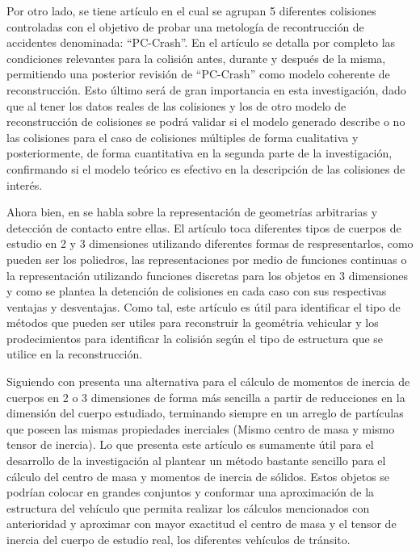 \begin{singlespace}
\hspace{1 cm} Por otro lado, se tiene \citet{Risac} artículo en el cual se agrupan 5 diferentes colisiones controladas con el objetivo de probar una metología de recontrucción de accidentes denominada: ``PC-Crash''. En el artículo se detalla por completo las condiciones relevantes para la colisión antes, durante y después de la misma, permitiendo una posterior revisión de ``PC-Crash'' como modelo coherente de reconstrucción. Esto último será de gran importancia en esta investigación, dado que al tener los datos reales de las colisiones y los de otro modelo de reconstrucción de colisiones se podrá validar si el modelo generado describe o no las colisiones para el caso de colisiones múltiples de forma cualitativa y posteriormente, de forma cuantitativa en la segunda parte de la investigación, confirmando si el modelo teórico es efectivo en la descripción de las colisiones de interés.

\hspace{1 cm} Ahora bien, en \citet{Hogue} se habla sobre la representación de geometrías arbitrarias y detección de contacto entre ellas. El artículo toca diferentes tipos de cuerpos de estudio en 2 y 3 dimensiones utilizando diferentes formas de respresentarlos, como pueden ser los poliedros, las representaciones por medio de funciones continuas o la representación utilizando funciones discretas para los objetos en 3 dimensiones y como se plantea la detención de colisiones en cada caso con sus respectivas ventajas y desventajas. Como tal, este artículo es útil para identificar el tipo de métodos que pueden ser utiles para reconstruir la geométria vehicular y los prodecimientos para identificar la colisión según el tipo de estructura que se utilice en la reconstrucción.

\hspace{1 cm} Siguiendo con \citet{Orasanu2010} presenta una alternativa para el cálculo de momentos de inercia de cuerpos en 2 o 3 dimensiones de forma más sencilla a partir de reducciones en la dimensión del cuerpo estudiado, terminando siempre en un arreglo de partículas que poseen las mismas propiedades inerciales (Mismo centro de masa y mismo tensor de inercia).  Lo que presenta este artículo es sumamente útil para el desarrollo de la investigación al plantear un método bastante sencillo para el cálculo del centro de masa y momentos de inercia de sólidos. Estos objetos se podrían colocar en grandes conjuntos y conformar una aproximación de la estructura del vehículo que permita realizar los cálculos mencionados con anterioridad y aproximar con mayor exactitud el centro de masa y el tensor de inercia del cuerpo de estudio real, los diferentes vehículos de tránsito.


\end{singlespace}
